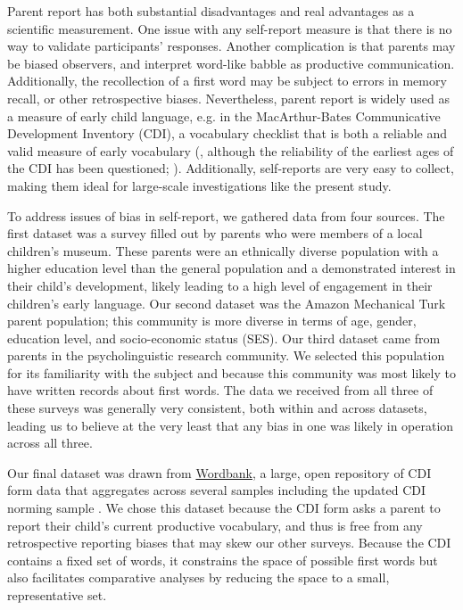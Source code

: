 \documentclass[10pt,letterpaper]{article}
\begin{document}
Parent report has both substantial disadvantages and real advantages as a scientific measurement. One issue with any self-report measure is that there is no way to validate participants' responses. Another complication is that parents may be biased observers, and interpret word-like babble as productive communication. Additionally, the recollection of a first word may be subject to errors in memory recall, or other retrospective biases. Nevertheless, parent report is widely used as a measure of early child language, e.g. in the MacArthur-Bates Communicative Development Inventory (CDI), a vocabulary checklist that is both a reliable and valid measure of early vocabulary (, although the reliability of the earliest ages of the CDI has been questioned; ). Additionally, self-reports are very easy to collect, making them ideal for large-scale investigations like the present study. 

To address issues of bias in self-report, we gathered data from four sources. The first dataset was a survey filled out by parents who were members of a local children's museum. These parents were an ethnically diverse population with a higher education level than the general population and a demonstrated interest in their child's development, likely leading to a high level of engagement in their children's early language. Our second dataset was the Amazon Mechanical Turk parent population; this community is more diverse in terms of age, gender, education level, and socio-economic status (SES). Our third dataset came from parents in the psycholinguistic research community. We selected this population for its familiarity with the subject and because this community was most likely to have written records about first words. The data we received from all three of these surveys was generally very consistent, both within and across datasets, leading us to believe at the very least that any bias in one was likely in operation across all three. 

Our final dataset was drawn from \href{http://wordbank.stanford.edu}{Wordbank}, a large, open repository of CDI form data that aggregates across several samples including the updated CDI norming sample \cite{fenson2007}. We chose this dataset because the CDI form asks a parent to report their child's current productive vocabulary, and thus is free from any retrospective reporting biases that may skew our other surveys. Because the CDI contains a fixed set of words, it constrains the space of possible first words but also facilitates comparative analyses by reducing the space to a small, representative set.
\end{document}
